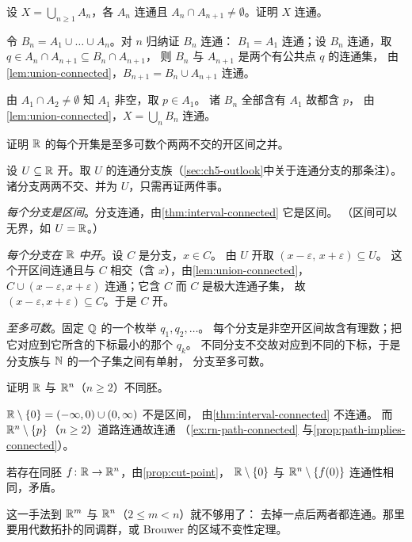 \begin{exercise}[结构]
  \label{exr:chain-union}
  设 \(X = \bigcup_{n \ge 1} A_{n}\)，各 \(A_{n}\) 连通且
  \(A_{n} \cap A_{n+1} \neq \emptyset\)。证明 \(X\) 连通。
  \begin{solution}
    令 \(B_{n} = A_{1} \cup \dots \cup A_{n}\)。对 \(n\) 归纳证 \(B_{n}\) 连通：
    \(B_{1}=A_{1}\) 连通；设 \(B_{n}\) 连通，取
    \(q \in A_{n} \cap A_{n+1} \subseteq B_{n} \cap A_{n+1}\)，
    则 \(B_{n}\) 与 \(A_{n+1}\) 是两个有公共点 \(q\) 的连通集，
    由\cref{lem:union-connected}，\(B_{n+1} = B_{n} \cup A_{n+1}\) 连通。

    由 \(A_{1} \cap A_{2} \neq \emptyset\) 知 \(A_{1}\) 非空，取 \(p \in A_{1}\)。
    诸 \(B_{n}\) 全部含有 \(A_{1}\) 故都含 \(p\)，
    由\cref{lem:union-connected}，\(X = \bigcup_{n} B_{n}\) 连通。
  \end{solution}
\end{exercise}

\begin{exercise}[延伸]
  \label{exr:open-decomposition}
  证明 \(\mathbb{R}\) 的每个开集是至多可数个两两不交的开区间之并。
  \begin{solution}
    设 \(U \subseteq \mathbb{R}\) 开。取 \(U\) 的连通分支族（\cref{sec:ch5-outlook}中关于连通分支的那条注）。
    诸分支两两不交、并为 \(U\)，只需再证两件事。

    \emph{每个分支是区间}。分支连通，由\cref{thm:interval-connected} 它是区间。
    （区间可以无界，如 \(U=\mathbb{R}\)。）

    \emph{每个分支在 \(\mathbb{R}\) 中开}。设 \(C\) 是分支，\(x \in C\)。
    由 \(U\) 开取 \((x-\varepsilon,\,x+\varepsilon) \subseteq U\)。
    这个开区间连通且与 \(C\) 相交（含 \(x\)），由\cref{lem:union-connected}，
    \(C \cup (x-\varepsilon,x+\varepsilon)\) 连通；它含 \(C\) 而 \(C\) 是极大连通子集，
    故 \((x-\varepsilon,x+\varepsilon) \subseteq C\)。于是 \(C\) 开。

    \emph{至多可数}。固定 \(\mathbb{Q}\) 的一个枚举 \(q_{1},q_{2},\dots\)。
    每个分支是非空开区间故含有理数；把它对应到它所含的下标最小的那个 \(q_{k}\)。
    不同分支不交故对应到不同的下标，于是分支族与 \(\mathbb{N}\) 的一个子集之间有单射，
    分支至多可数。
  \end{solution}
\end{exercise}

\begin{exercise}[延伸]
  \label{exr:r-vs-rn}
  证明 \(\mathbb{R}\) 与 \(\mathbb{R}^{n}\)（\(n \ge 2\)）不同胚。
  \begin{solution}
    \(\mathbb{R} \setminus \left\{0\right\} = (-\infty,0) \cup (0,\infty)\) 不是区间，
    由\cref{thm:interval-connected} 不连通。
    而 \(\mathbb{R}^{n} \setminus \left\{p\right\}\)（\(n \ge 2\)）道路连通故连通
    （\cref{ex:rn-path-connected} 与\cref{prop:path-implies-connected}）。

    若存在同胚 \(f \colon \mathbb{R} \to \mathbb{R}^{n}\)，由\cref{prop:cut-point}，
    \(\mathbb{R} \setminus \left\{0\right\}\) 与 \(\mathbb{R}^{n} \setminus \left\{f(0)\right\}\) 连通性相同，矛盾。

    这一手法到 \(\mathbb{R}^{m}\) 与 \(\mathbb{R}^{n}\)（\(2 \le m < n\)）就不够用了：
    去掉一点后两者都连通。那里要用代数拓扑的同调群，或 Brouwer 的区域不变性定理。
  \end{solution}
\end{exercise}

